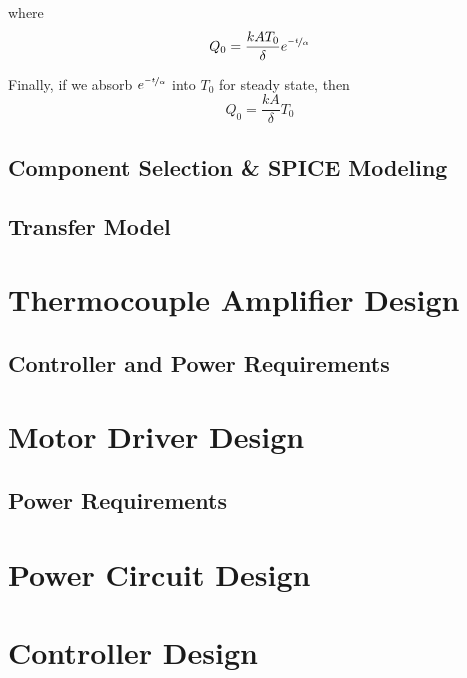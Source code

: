 \documentclass[10pt, twocolumn]{article}
\begin{document}
where
\begin{equation*}
Q_{0}=\frac{kAT_{0}}{\delta}e^{\nicefrac{-t}{\alpha}}
\end{equation*}

Finally, if we absorb $e^{\nicefrac{-t}{\alpha}}$ into $T_{0}$ for steady state, then
\begin{equation}
Q_{0}=\frac{kA}{\delta}T_{0}
\end{equation}





\subsection{Component Selection \& SPICE Modeling}

\subsection{Transfer Model}

\section{Thermocouple Amplifier Design}

\subsection{Controller and Power Requirements}

\section{Motor Driver Design}

\subsection{Power Requirements}

\section{Power Circuit Design}

\section{Controller Design}
\end{document}
